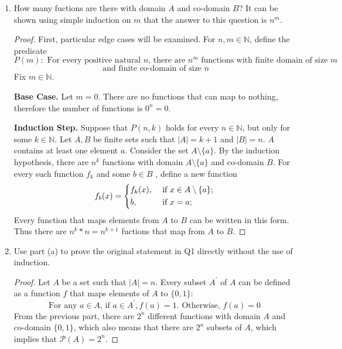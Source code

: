 \documentclass[11pt]{article}
\begin{document}
    \begin{enumerate}[label=\alph*)]
        \item How many fuctions are there with domain \(A\) and co-domain \(B\)?
        It can be shown using simple induction on \(m\) that the answer to this question is \(n^m\).
        \begin{proof}
            First, particular edge cases will be examined.
            For \(n,m \in \mathbb{N} \), define the predicate
            \[
                P(m) \colon \text{ For every positive natural } n \text{, there are } n^m \text{ functions with finite domain of size } m
            \]
            \[
                \text{ and finite co-domain of size } n
            \]
            Fix \(m \in \mathbb{N}\).

            \textbf{Base Case.} Let \(m = 0\). There are no functions that can map to nothing, therefore the number of functions is \(0^n = 0\).

            \textbf{Induction Step.} Suppose that \(P(n, k)\) holds for every \(n \in \mathbb{N}\), but only for some \(k \in \mathbb{N}\). Let \(A, B\) be finite sets such that \(\left\vert A \right\vert = k+1\) and \(\left\vert B \right\vert = n\). \(A\) contains at least one element \(a\). Consider the set \(A\setminus\{a\}\). By the induction hypothesis, there are \(n^k\) functions with domain \(A\setminus\{a\}\) and co-domain \(B\). For every such function \(f_k\) and some \(b \in B\) , define a new function
            \[
                f_b(x) = \begin{dcases}
                    f_k(x), &\text{ if } x \in A\setminus \{a\} ;\\
                    b, &\text{ if } x=a;
                \end{dcases}
            \]
            Every function that maps elements from \(A\) to \(B\) can be written in this form. Thus there are \(n^k*n = n^{k+1} \) fuctions that map from \(A\) to \(B\).

        \end{proof}

        \item Use part (a) to prove the original statement in Q1 directly without the use of induction.
        \begin{proof}
            Let \(A\) be a set such that \(|A| = n\). Every subset \(A^\prime\) of \(A\) can be defined as a function \(f\) that maps elements of \(A\) to \(\{0,1\}\):
            \[
                \text{For any } a \in A \text{, if } a \in A^\prime, f(a) = 1 \text{. Otherwise, } f(a) = 0
            \]
            From the previous part, there are \(2^n\) different functions with domain \(A\) and co-domain \(\{0,1\}\), which also means that there are \(2^n\) subsets of \(A\), which implies that \(\mathcal{P} (A)=2^n\).

        \end{proof}
    \end{enumerate}
\end{document}
